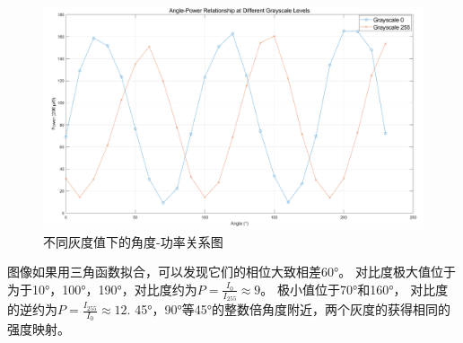 \documentclass[11pt,a4paper]{article}
\begin{document}
        \begin{figure}[H]
            \centering
            \includegraphics[width=\textwidth]{半波片角度-功率图.png}
            \caption{不同灰度值下的角度-功率关系图}
            \label{fig:angle-power-relation}
            \end{figure}
图像如果用三角函数拟合，可以发现它们的相位大致相差60°。
对比度极大值位于为于10°，100°，190°，对比度约为$P=\frac{I_0}{I_{255}}\approx 9$。
极小值位于70°和160°， 对比度的逆约为$P=\frac{I_{255}}{I_0}\approx 12$. 
45°，90°等45°的整数倍角度附近，两个灰度的获得相同的强度映射。
\end{document}
